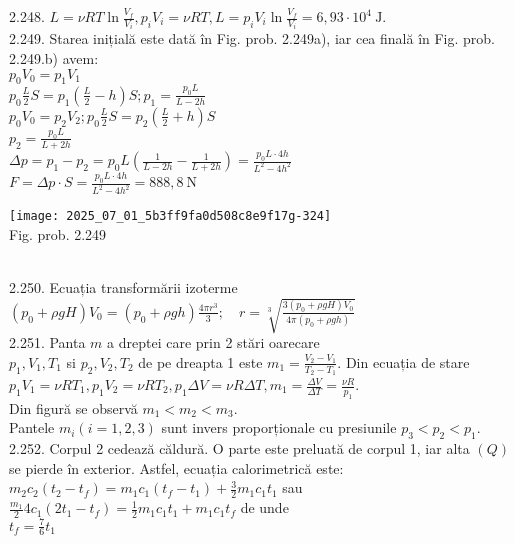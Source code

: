 2.248. $L=\nu R T \ln \frac{V_{f}}{V_{i}}, p_{i} V_{i}=\nu R T, L=p_{i} V_{i} \ln \frac{V_{f}}{V_{i}}=6,93 \cdot 10^{4} \mathrm{~J}$.\\

2.249. Starea inițială este dată în Fig. prob. 2.249a), iar cea finală în Fig. prob. 2.249.b) avem:\\ $p_{0} V_{0}=p_{1} V_{1}$\\ $p_{0} \frac{L}{2} S=p_{1}\left(\frac{L}{2}-h\right) S ; p_{1}=\frac{p_{0} L}{L-2 h}$\\ $p_{0} V_{0}=p_{2} V_{2} ; p_{0} \frac{L}{2} S=p_{2}\left(\frac{L}{2}+h\right) S$\\ $p_{2}=\frac{p_{0} L}{L+2 h}$\\ $\Delta p=p_{1}-p_{2}=p_{0} L\left(\frac{1}{L-2 h}-\frac{1}{L+2 h}\right)=\frac{p_{0} L \cdot 4 h}{L^{2}-4 h^{2}}$\\ $F=\Delta p \cdot S=\frac{p_{0} L \cdot 4 h}{L^{2}-4 h^{2}}=888,8 \mathrm{~N}$\\ \begin{center} \texttt{[image: 2025\_07\_01\_5b3ff9fa0d508c8e9f17g-324]}\\ Fig. prob. 2.249 \end{center}\\

2.250. Ecuația transformării izoterme\\ $\left(p_{0}+\rho g H\right) V_{0}=\left(p_{0}+\rho g h\right) \frac{4 \pi r^{3}}{3} ; \quad r=\sqrt[3]{\frac{3\left(p_{0}+\rho g H\right) V_{0}}{4 \pi\left(p_{0}+\rho g h\right)}}$\\

2.251. Panta $m$ a dreptei care prin 2 stări oarecare\\ $p_{1}, V_{1}, T_{1}$ si $p_{2}, V_{2}, T_{2}$ de pe dreapta 1 este $m_{1}=\frac{V_{2}-V_{1}}{T_{2}-T_{1}}$. Din ecuația de stare $p_{1} V_{1}=\nu R T_{1}, p_{1} V_{2}=\nu R T_{2}, p_{1} \Delta V=\nu R \Delta T, m_{1}=\frac{\Delta V}{\Delta T}=\frac{\nu R}{p_{1}}$.\\ Din figură se observă $m_{1}<m_{2}<m_{3}$.\\ Pantele $m_{i}(i=1,2,3)$ sunt invers proporționale cu presiunile $p_{3}<p_{2}<p_{1}$.\\

2.252. Corpul 2 cedează căldură. O parte este preluată de corpul 1, iar alta $(Q)$ se pierde în exterior. Astfel, ecuația calorimetrică este:\\ $m_{2} c_{2}\left(t_{2}-t_{f}\right)=m_{1} c_{1}\left(t_{f}-t_{1}\right)+\frac{3}{2} m_{1} c_{1} t_{1}$ sau\\ $\frac{m_{1}}{2} 4 c_{1}\left(2 t_{1}-t_{f}\right)=\frac{1}{2} m_{1} c_{1} t_{1}+m_{1} c_{1} t_{f}$ de unde\\ $t_{f}=\frac{7}{6} t_{1}$\\

